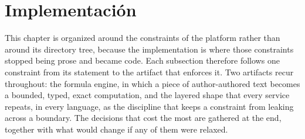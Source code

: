 

\section{Implementación}

This chapter is organized around the constraints of the platform rather than around its
directory tree, because the implementation is where those constraints stopped being prose and
became code. Each subsection therefore follows one constraint from its statement to the artifact
that enforces it. Two artifacts recur throughout: the formula engine, in which a piece of
author-authored text becomes a bounded, typed, exact computation, and the layered shape
 \textrightarrow{}  \textrightarrow{}  that every service
repeats, in every language, as the discipline that keeps a constraint from leaking across a
boundary. The decisions that cost the most are gathered at the end, together with what would
change if any of them were relaxed.

